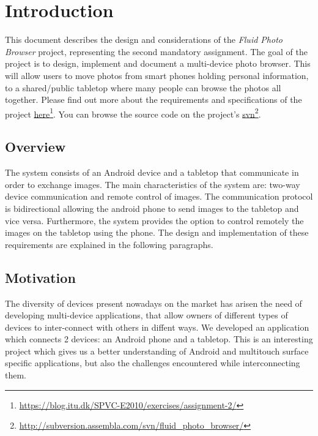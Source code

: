\section{Introduction}
\label{sec.introduction}
This document describes the design and considerations of the \emph{Fluid Photo
Browser} project, representing the second mandatory assignment. The goal of the
project is to design, implement and document a multi-device photo browser. This
will allow users to move photos from smart phones holding personal
information, to a shared/public tabletop where many people can browse the photos
all together. Please find out more about the requirements and
specifications of the project
\href{https://blog.itu.dk/SPVC-E2010/exercises/assignment-2/}{here}\footnote{\url{https://blog.itu.dk/SPVC-E2010/exercises/assignment-2/}}.
You can browse the source code on the project's
\href{http://subversion.assembla.com/svn/fluid_photo_browser/trunk}{svn}\footnote{\url{http://subversion.assembla.com/svn/fluid_photo_browser/}}.

\subsection{Overview}
\label{sec.introduction.overview}
The system consists of an Android device and a tabletop that communicate in
order to exchange images. The main characteristics of the system are: two-way
device communication and remote control of images. The communication protocol is
bidirectional allowing the android phone to send images to the tabletop and vice
versa. Furthermore, the system provides the option to control remotely the
images on the tabletop using the phone. The design and implementation of these
requirements are explained in the following paragraphs.

\subsection{Motivation}
\label{sec.introduction.motivation}
The diversity of devices present nowadays on the market has arisen the
need of developing multi-device applications, that allow owners of different
types of devices to inter-connect with others in diffent ways. We developed
an application which connects 2 devices: an Android phone and a tabletop. This
is an interesting project which gives us a better understanding of Android and
multitouch surface specific applications, but also the challenges encountered
while interconnecting them.
